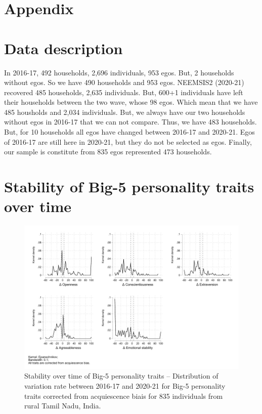 \documentclass[a4paper, 11pt, onecolumn]{article}
\begin{document}
\newpage
\appendix






\section*{Appendix}
\label{app:APP}

\section{Data description}
\label{app:data}

In 2016-17, 492 households, 2,696 individuals, 953 egos.
But, 2 households without egos.
So we have 490 households and 953 egos.
NEEMSIS2 (2020-21) recovered 485 households, 2,635 individuals.
But, 600+1 individuals have left their households between the two wave, whose 98 egos.
Which mean that we have 485 housholds and 2,034 individuals.
But, we always have our two households without egos in 2016-17 that we can not compare.
Thus, we have 483 households.
But, for 10 households all egos have changed between 2016-17 and 2020-21.
Egos of 2016-17 are still here in 2020-21, but they do not be selected as egos. 
Finally, our sample is constitute from 835 egos represented 473 households.


\clearpage
\newpage
\section{Stability of Big-5 personality traits over time}
\label{section:stab_big5}

\begin{figure}[htpb]
\raggedright
\includegraphics[width=\textwidth]{INPUT/Stabcorr}
\caption{Stability over time of Big-5 personality traits -- Distribution of variation rate between 2016-17 and 2020-21 for Big-5 personality traits corrected from acquiescence biais for 835 individuals from rural Tamil Nadu, India.}
\label{fig:stab}
\end{figure}
\end{document}
